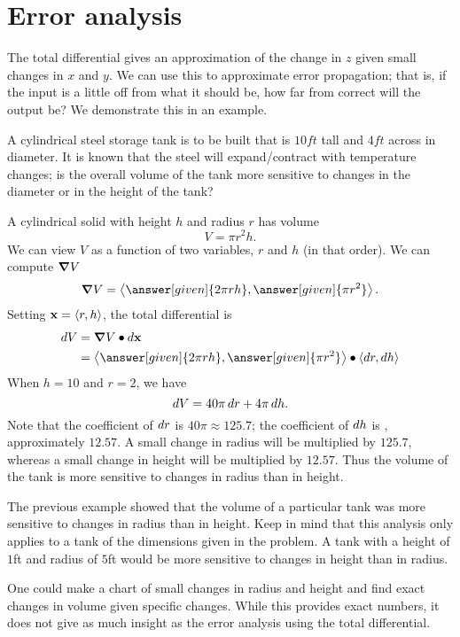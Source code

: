 \documentclass{ximera}
\begin{document}
\section{Error analysis}

The total differential gives an approximation of the change in $z$
given small changes in $x$ and $y$. We can use this to approximate
error propagation; that is, if the input is a little off from what it
should be, how far from correct will the output be? We demonstrate
this in an example.  

\begin{example}
  A cylindrical steel storage tank is to be built that is
  $10\unit{ft}$ tall and $4\unit{ft}$ across in diameter. It is known
  that the steel will expand/contract with temperature changes; is the
  overall volume of the tank more sensitive to changes in the diameter
  or in the height of the tank?
  \begin{explanation}
    A cylindrical solid with height $h$ and radius $r$ has volume
    \[
    V = \pi r^2h.
    \]
    We can view $V$ as a function of two variables, $r$ and $h$ (in
    that order). We can compute $\boldsymbol\nabla V$
    \[
    \grad V  = \vector{\answer[given]{2\pi r h},\answer[given]{\pi r^2}}.
    \]
    Setting $\mathbf{x}=\left\langle r,h\right\rangle$, the total differential is
    \begin{align*}
    \d V &=\grad V \dotp \d \vec{x}\\
    &=\vector{\answer[given]{2\pi rh},\answer[given]{ \pi r^2}}\dotp\vector{\d r,\d h}
    \end{align*}
    When $h = 10$ and $r = 2$, we have
    \[
    \mathop{}\!d V = 40\pi \mathop{}\!d r + 4\pi \mathop{}\!d h.
    \]
    Note that the coefficient of $\mathop{}\!d r$ is $40\pi\approx 125.7$; the
    coefficient of $\mathop{}\!d h$ is , approximately $12.57$. A small
    change in radius will be multiplied by $125.7$, whereas a small
    change in height will be multiplied by $12.57$. Thus the volume of
    the tank is more sensitive to changes in radius than in height.
  \end{explanation}
\end{example}

The previous example showed that the volume of a particular tank was
more sensitive to changes in radius than in height. Keep in mind that
this analysis only applies to a tank of the dimensions given in the
problem. A tank with a height of $1$ft and radius of $5$ft would be
more sensitive to changes in height than in radius.

One could make a chart of small changes in radius and height and find
exact changes in volume given specific changes. While this provides
exact numbers, it does not give as much insight as the error analysis
using the total differential.
\end{document}
